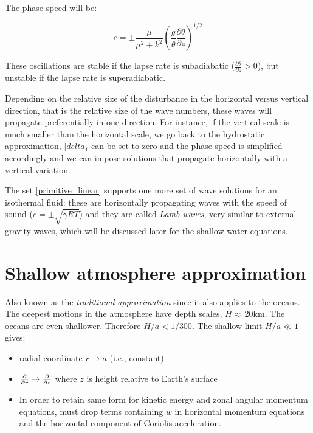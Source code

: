 The phase speed will be:

\begin{equation}
	c = \pm \frac{\mu}{\mu^2+k^2} (\frac{g}{\bar{\theta}} \frac{\partial \bar{\theta}}{\partial z} )^{1/2}
\end{equation}

These oscillations are stable if the lapse rate is subadiabatic ($\frac{\partial \bar{\theta}}{\partial z}>0$), but unstable if the lapse rate is superadiabatic.

Depending on the relative size of the disturbance in the horizontal versus vertical direction, that is the relative size of the wave numbers, these waves will propagate preferentially in one direction. For instance, if the vertical scale is much smaller than the horizontal scale, we go back to the hydrostatic approximation, $|delta_1$ can be set to zero and the phase speed is simplified accordingly and we can impose solutions that propagate horizontally with a vertical variation.

The set \ref{primitive_linear} supports one more set of wave solutions for an isothermal fluid: these are horizontally propagating waves with the speed of sound ($c=\pm \sqrt{\gamma R \bar{T}}$) and they are called \emph{Lamb waves}, very similar to external gravity waves, which will be discussed later for the shallow water equations.

\section{Shallow atmosphere approximation} 

Also known as the {\em traditional approximation} since it also
applies to the oceans. The deepest motions in the atmosphere have
depth scales, $H\approx\,$20km. The oceans are even shallower. Therefore
$H/a< 1/300$. The shallow limit $H/a\ll 1$ gives:

\begin{itemize}
	\item
	radial coordinate $r\rightarrow a$ (i.e., constant)
	
	\item
	$\frac{\partial }{\partial r}\rightarrow \frac{\partial }{\partial z}$ where $z$ is height relative to Earth's surface
	
	\item
	In order to retain same form for kinetic energy and zonal angular
	momentum equations, must drop terms containing $w$ in horizontal
	momentum equations and the horizontal component of Coriolis
	acceleration.
\end{itemize}

